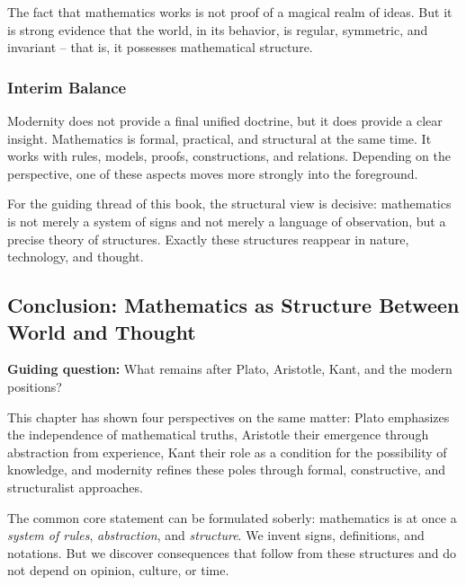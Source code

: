 \begin{DidacticBox}
	\label{box:without-mysticism}
	\small
	The fact that mathematics works
	is not proof of a magical realm of ideas.
	But it is strong evidence
	that the world, in its behavior, is regular,
	symmetric, and invariant --
	that is, it possesses mathematical structure.
\end{DidacticBox}

\subsubsection*{Interim Balance}

Modernity does not provide a final unified doctrine,
but it does provide a clear insight.
Mathematics is formal,
practical,
and structural at the same time.
It works with rules,
models,
proofs,
constructions,
and relations.
Depending on the perspective, one of these aspects moves more strongly into the foreground.

For the guiding thread of this book,
the structural view is decisive:
mathematics is not merely a system of signs
and not merely a language of observation,
but a precise theory of structures.
Exactly these structures reappear in nature,
technology, and thought.


\subsection{Conclusion: Mathematics as Structure Between World and Thought}
\label{sec:8.5}

\textbf{Guiding question:} What remains after Plato, Aristotle, Kant, and the modern positions?

\medskip

This chapter has shown four perspectives on the same matter:
Plato emphasizes the independence of mathematical truths,
Aristotle their emergence through abstraction from experience,
Kant their role as a condition for the possibility of knowledge,
and modernity refines these poles
through formal,
constructive,
and structuralist approaches.

The common core statement can be formulated soberly:
mathematics is at once a \emph{system of rules},
\emph{abstraction},
and \emph{structure}.
We invent signs,
definitions, and notations.
But we discover consequences
that follow from these structures
and do not depend on opinion,
culture, or time.

